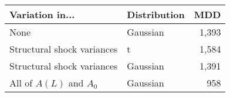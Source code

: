 \begingroup
\fontsize{12.0pt}{14.4pt}\selectfont
\begin{tabular}{llr}
\toprule
Variation in... & Distribution & MDD \\ 
\midrule\addlinespace[2.5pt]
None & Gaussian & 1,393 \\ 
Structural shock variances & t & 1,584 \\ 
Structural shock variances & Gaussian & 1,391 \\ 
All of \(A(L)\) and \(A_0\) & Gaussian & 958 \\ 
\bottomrule
\end{tabular}
\endgroup

